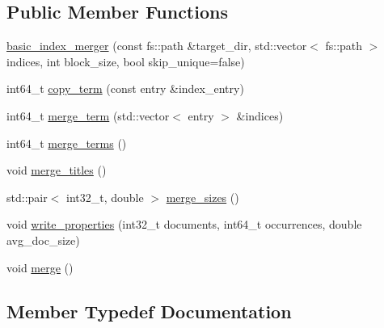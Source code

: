 \subsection*{Public Member Functions}
\begin{DoxyCompactItemize}
\item 
\mbox{\hyperlink{classirk_1_1basic__index__merger_ade68b591a43b8e56e32fed169205c33a}{basic\+\_\+index\+\_\+merger}} (const fs\+::path \&target\+\_\+dir, std\+::vector$<$ fs\+::path $>$ indices, int block\+\_\+size, bool skip\+\_\+unique=false)
\item 
int64\+\_\+t \mbox{\hyperlink{classirk_1_1basic__index__merger_a1c6c4c5bb3b25bd4a843343d96d54b92}{copy\+\_\+term}} (const entry \&index\+\_\+entry)
\item 
int64\+\_\+t \mbox{\hyperlink{classirk_1_1basic__index__merger_ade56595ec2e771cf4b5a6e6942d4187a}{merge\+\_\+term}} (std\+::vector$<$ entry $>$ \&indices)
\item 
int64\+\_\+t \mbox{\hyperlink{classirk_1_1basic__index__merger_ab2f4a0b26b16dc7d63673814003bda4b}{merge\+\_\+terms}} ()
\item 
void \mbox{\hyperlink{classirk_1_1basic__index__merger_ab9772e2454466544841c08b245964736}{merge\+\_\+titles}} ()
\item 
std\+::pair$<$ int32\+\_\+t, double $>$ \mbox{\hyperlink{classirk_1_1basic__index__merger_a243264cb144d805392d61266254925ee}{merge\+\_\+sizes}} ()
\item 
void \mbox{\hyperlink{classirk_1_1basic__index__merger_a4264e90f9176de1b6afa731e670df8af}{write\+\_\+properties}} (int32\+\_\+t documents, int64\+\_\+t occurrences, double avg\+\_\+doc\+\_\+size)
\item 
void \mbox{\hyperlink{classirk_1_1basic__index__merger_a56e0dfd5c2381fd2fbcd5dd8beaa22d9}{merge}} ()
\end{DoxyCompactItemize}


\subsection{Member Typedef Documentation}
\mbox{\label{classirk_1_1basic__index__merger_af331ba6d7dd6d96484c6608f4236d8f1}} 
